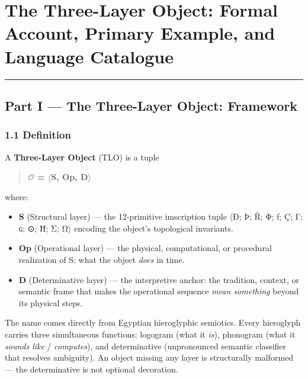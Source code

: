 \section{The Three-Layer Object: Formal Account, Primary Example, and
Language
Catalogue}\label{the-three-layer-object-formal-account-primary-example-and-language-catalogue}

\begin{center}\rule{0.5\linewidth}{0.5pt}\end{center}

\subsection{Part I --- The Three-Layer Object:
Framework}\label{part-i-the-three-layer-object-framework}

\subsubsection{1.1 Definition}\label{definition}

A \textbf{Three-Layer Object} (TLO) is a tuple

\begin{quote}
\textbf{\(\mathcal{O}\) = \(\langle\)S, Op, D\(\rangle\)}
\end{quote}

where:

\begin{itemize}
\tightlist
\item
  \textbf{S} (Structural layer) --- the 12-primitive imscription tuple
  \(\langle\)Ð; Þ; Ř; Φ; ƒ; Ç; Γ; ɢ; ⊙; Ħ; Σ; Ω\(\rangle\) encoding the object's topological
  invariants.
\item
  \textbf{Op} (Operational layer) --- the physical, computational, or
  procedural realization of S: what the object \emph{does} in time.
\item
  \textbf{D} (Determinative layer) --- the interpretive anchor: the
  tradition, context, or semantic frame that makes the operational
  sequence \emph{mean something} beyond its physical steps.
\end{itemize}

The name comes directly from Egyptian hieroglyphic semiotics. Every
hieroglyph carries three simultaneous functions: logogram (what it
\emph{is}), phonogram (what it \emph{sounds like} / \emph{computes}),
and determinative (unpronounced semantic classifier that resolves
ambiguity). An object missing any layer is structurally malformed ---
the determinative is not optional decoration.

